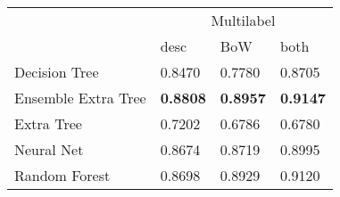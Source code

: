 \begin{tabular}{|l|l|l|l| }
\hline
 &  \multicolumn{3}{c|}{Multilabel} \\
\cline{2-4} & desc & BoW & both \\ \hline
Decision Tree       & 0.8470 & 0.7780 & 0.8705\\
Ensemble Extra Tree & {\bf 0.8808} & {\bf 0.8957} & {\bf 0.9147}\\
Extra Tree          & 0.7202 & 0.6786 & 0.6780\\
Neural Net          & 0.8674 & 0.8719 & 0.8995\\
Random Forest       & 0.8698 & 0.8929 & 0.9120\\
\hline
\end{tabular}